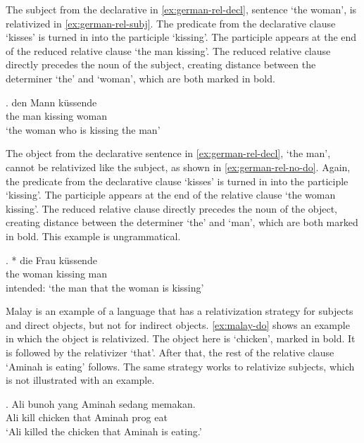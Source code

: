 The subject from the declarative in \ref{ex:german-rel-decl}, sentence  `the woman', is relativized in \ref{ex:german-rel-subj}. The predicate from the declarative clause  `kisses' is turned in into the participle  `kissing'. The participle appears at the end of the reduced relative clause  `the man kissing'. The reduced relative clause directly precedes the noun of the subject, creating distance between the determiner  `the' and  `woman', which are both marked in bold.

\exg.  den Mann küssende \\
 the man kissing woman\\
 `the woman who is kissing the man' \label{ex:german-rel-subj}

The object from the declarative sentence in \ref{ex:german-rel-decl},  `the man', cannot be relativized like the subject, as shown in \ref{ex:german-rel-no-do}. Again, the predicate from the declarative clause  `kisses' is turned in into the participle  `kissing'. The participle appears at the end of the relative clause  `the woman kissing'. The reduced relative clause directly precedes the noun of the object, creating distance between the determiner  `the' and  `man', which are both marked in bold. This example is ungrammatical.

\exg. * die Frau küssende \\
 the woman kissing man\\
 intended: `the man that the woman is kissing' \label{ex:german-rel-no-do}

Malay is an example of a language that has a relativization strategy for subjects and direct objects, but not for indirect objects. \ref{ex:malay-do} shows an example in which the object is relativized. The object here is  `chicken', marked in bold. It is followed by the relativizer  `that'. After that, the rest of the relative clause  `Aminah is eating' follows. The same strategy works to relativize subjects, which is not illustrated with an example.

\exg. Ali bunoh  yang Aminah sedang memakan.\\
 Ali kill chicken that Aminah \ac{prog} eat\\
 `Ali killed the chicken that Aminah is eating.' \label{ex:malay-do}

